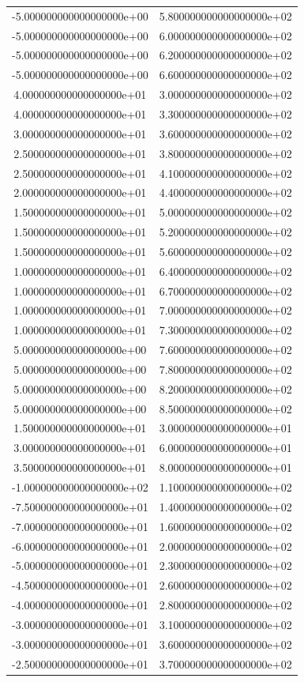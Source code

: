 \begin{table}
\begin{subfigure}{0.48\textwidth}
\begin{tabular}{S S}
-5.000000000000000000e+00 & 5.800000000000000000e+02\\
-5.000000000000000000e+00 & 6.000000000000000000e+02\\
-5.000000000000000000e+00 & 6.200000000000000000e+02\\
-5.000000000000000000e+00 & 6.600000000000000000e+02\\
4.000000000000000000e+01 & 3.000000000000000000e+02\\
4.000000000000000000e+01 & 3.300000000000000000e+02\\
3.000000000000000000e+01 & 3.600000000000000000e+02\\
2.500000000000000000e+01 & 3.800000000000000000e+02\\
2.500000000000000000e+01 & 4.100000000000000000e+02\\
2.000000000000000000e+01 & 4.400000000000000000e+02\\
1.500000000000000000e+01 & 5.000000000000000000e+02\\
1.500000000000000000e+01 & 5.200000000000000000e+02\\
1.500000000000000000e+01 & 5.600000000000000000e+02\\
1.000000000000000000e+01 & 6.400000000000000000e+02\\
1.000000000000000000e+01 & 6.700000000000000000e+02\\
1.000000000000000000e+01 & 7.000000000000000000e+02\\
1.000000000000000000e+01 & 7.300000000000000000e+02\\
5.000000000000000000e+00 & 7.600000000000000000e+02\\
5.000000000000000000e+00 & 7.800000000000000000e+02\\
5.000000000000000000e+00 & 8.200000000000000000e+02\\
5.000000000000000000e+00 & 8.500000000000000000e+02\\
1.500000000000000000e+01 & 3.000000000000000000e+01\\
3.000000000000000000e+01 & 6.000000000000000000e+01\\
3.500000000000000000e+01 & 8.000000000000000000e+01\\
-1.000000000000000000e+02 & 1.100000000000000000e+02\\
-7.500000000000000000e+01 & 1.400000000000000000e+02\\
-7.000000000000000000e+01 & 1.600000000000000000e+02\\
-6.000000000000000000e+01 & 2.000000000000000000e+02\\
-5.000000000000000000e+01 & 2.300000000000000000e+02\\
-4.500000000000000000e+01 & 2.600000000000000000e+02\\
-4.000000000000000000e+01 & 2.800000000000000000e+02\\
-3.000000000000000000e+01 & 3.100000000000000000e+02\\
-3.000000000000000000e+01 & 3.600000000000000000e+02\\
-2.500000000000000000e+01 & 3.700000000000000000e+02\\


\end{tabular}
\end{subfigure}
\end{table}
